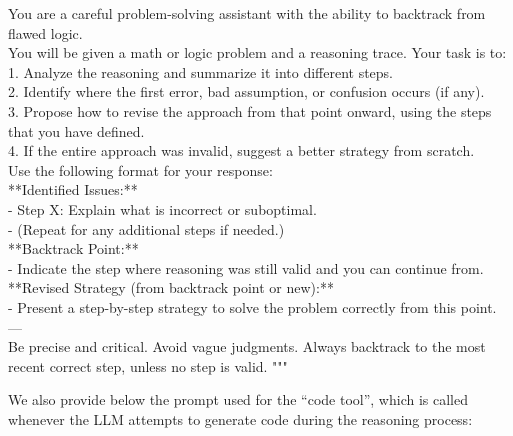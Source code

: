 \begin{tcolorbox}[
    colback=gray!10,
    colframe=black,
    arc=4pt,
    boxrule=1pt,
    title=\textbf{Backtracking Prompt},
    fonttitle=\bfseries,
    enhanced,
    left=4pt,
    right=4pt,
    top=4pt,
    bottom=4pt,
    breakable
]
You are a careful problem-solving assistant with the ability to backtrack from flawed logic.\\

You will be given a math or logic problem and a reasoning trace. Your task is to:\\
1. Analyze the reasoning and summarize it into different steps.\\
2. Identify where the first error, bad assumption, or confusion occurs (if any).\\
3. Propose how to revise the approach from that point onward, using the steps that you have defined.\\
4. If the entire approach was invalid, suggest a better strategy from scratch.\\

Use the following format for your response:\\

**Identified Issues:**\\
- Step X: Explain what is incorrect or suboptimal.\\
- (Repeat for any additional steps if needed.)\\

**Backtrack Point:**\\
- Indicate the step where reasoning was still valid and you can continue from.\\

**Revised Strategy (from backtrack point or new):**\\
- Present a step-by-step strategy to solve the problem correctly from this point.\\
---\\

Be precise and critical. Avoid vague judgments. Always backtrack to the most recent correct step, unless no step is valid.
"""
\end{tcolorbox}


We also provide below the prompt used for the ``code tool'', which is called whenever the LLM attempts to generate code during the reasoning process:

